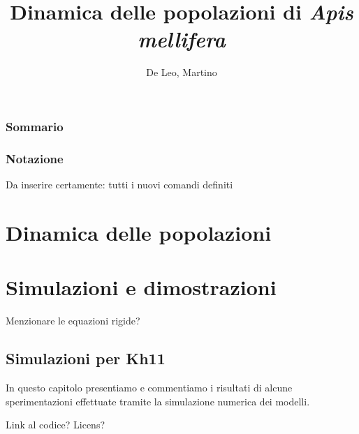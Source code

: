 \documentclass[12pt,a4paper,oneside,hidelinks]{book} %
\author{De Leo, Martino}
\title{Dinamica delle popolazioni di \emph{Apis mellifera} }
\begin{document}
\maketitle %

\frontmatter

\section*{Sommario}


\section*{Notazione}
Da inserire certamente: tutti i nuovi comandi definiti

\cleardoublepage

\tableofcontents

\listoffigures



\mainmatter

\clearpage
\part{Dinamica delle popolazioni}





\part{Simulazioni e dimostrazioni}
Menzionare le equazioni rigide?

\chapter{Simulazioni per Kh11}
In questo capitolo presentiamo e commentiamo i risultati di alcune sperimentazioni effettuate tramite
la simulazione numerica dei modelli.

Link al codice? Licens?








\appendix



\backmatter

\cleardoublepage
{}
\nocite{*} %
\printbibliography
\end{document}
